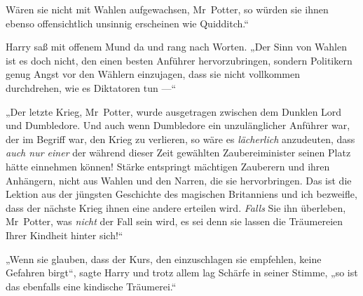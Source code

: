 Wären sie nicht mit Wahlen aufgewachsen, Mr~Potter, so würden sie ihnen ebenso offensichtlich unsinnig erscheinen wie Quidditch.“

Harry saß mit offenem Mund da und rang nach Worten.
„Der Sinn von Wahlen ist es doch nicht, den einen besten Anführer hervorzubringen, sondern Politikern genug Angst vor den Wählern einzujagen, dass sie nicht vollkommen durchdrehen, wie es Diktatoren tun —“

„Der letzte Krieg, Mr~Potter, wurde ausgetragen zwischen dem Dunklen Lord und Dumbledore. Und auch wenn Dumbledore ein unzulänglicher Anführer war, der im Begriff war, den Krieg zu verlieren, so wäre es \emph{lächerlich} anzudeuten, dass \emph{auch nur einer} der während dieser Zeit gewählten Zaubereiminister seinen Platz hätte einnehmen können! Stärke entspringt mächtigen Zauberern und ihren Anhängern, nicht aus Wahlen und den Narren, die sie hervorbringen. Das ist die Lektion aus der jüngsten Geschichte des magischen Britanniens und ich bezweifle, dass der nächste Krieg ihnen eine andere erteilen wird. \emph{Falls} Sie ihn überleben, Mr~Potter, was \emph{nicht} der Fall sein wird, es sei denn sie lassen die Träumereien Ihrer Kindheit hinter sich!“

„Wenn sie glauben, dass der Kurs, den einzuschlagen sie empfehlen, keine Gefahren birgt“, sagte Harry und trotz allem lag Schärfe in seiner Stimme, „so ist das ebenfalls eine kindische Träumerei.“

